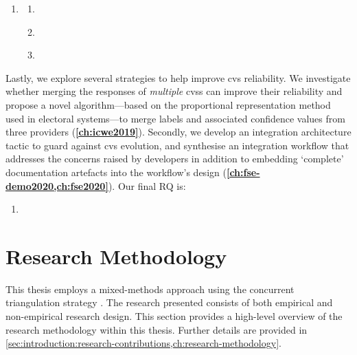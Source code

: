 \begin{leftbar}
\begin{enumerate}[label=\faQuestionCircle~~\textbf{RQ\arabic*.}, ref=RQ\arabic*, leftmargin=2.5\parindent, rightmargin=1\parindent,start=3]
  \item \textbf{\RQThreeTextDevMiscomprehension{}}\label{rq:devs}
  \begin{enumerate}[label=\textit{RQ3.\arabic*.}, ref=RQ3.\arabic*]
    \item \RQThreeTextDevMiscomprehensionIssueTypes{} \label{rq:devs:issues}
    \item \RQThreeTextDevMiscomprehensionFrustration{} \label{rq:devs:frustration}
    \item \RQThreeTextDevMiscomprehensionVsConventional{} \label{rq:devs:vs-traditional}
  \end{enumerate}
\end{enumerate}
\end{leftbar}


Lastly, we explore several strategies to help improve \gls{cvs} reliability. We investigate whether merging the responses of \textit{multiple} \glspl{cvs} can improve their reliability and propose a novel algorithm---based on the proportional representation method used in electoral systems---to merge labels and associated confidence values from three providers (\textbf{\cref{ch:icwe2019}}). Secondly, we develop an integration architecture tactic to guard against \gls{cvs} evolution, and synthesise an integration workflow that addresses the concerns raised by developers in addition to embedding `complete' documentation artefacts into the workflow's design (\textbf{\cref{ch:fse-demo2020,ch:fse2020}}). Our final RQ is:

\begin{leftbar}
\begin{enumerate}[label=\faQuestionCircle~~\textbf{RQ\arabic*.}, ref=RQ\arabic*, leftmargin=2.5\parindent, rightmargin=1\parindent,start=4]
  \item \textbf{\RQFourDesign{}}\label{rq:design}
\end{enumerate}
\end{leftbar}

\section{Research Methodology}
\label{sec:introduction:method}

This thesis employs a mixed-methods approach using the concurrent triangulation strategy \citep{Jick:1979el,Bratthall2002}. The research presented consists of both empirical and non-empirical research design. This section provides a high-level overview of the research methodology within this thesis. Further details are provided in  \cref{sec:introduction:research-contributions,ch:research-methodology}.

